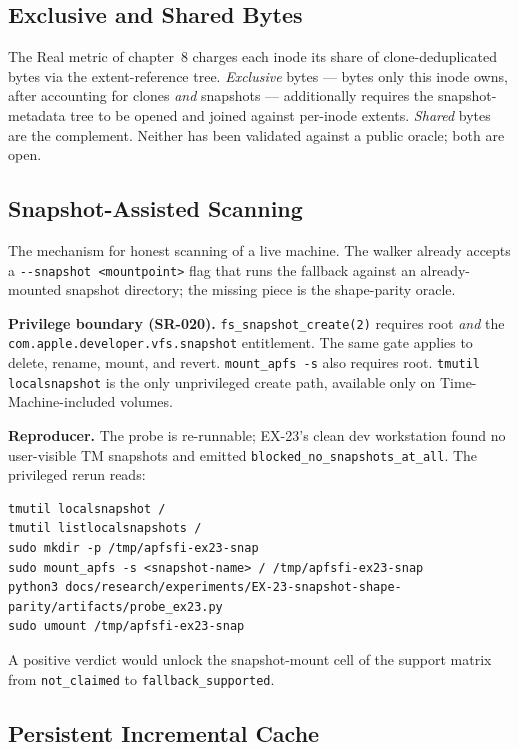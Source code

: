 \subsection{Exclusive and Shared Bytes}

The Real metric of chapter~8 charges each inode its share of
clone-deduplicated bytes via the extent-reference tree.
\emph{Exclusive} bytes --- bytes only this inode owns, after
accounting for clones \emph{and} snapshots --- additionally
requires the snapshot-metadata tree to be opened and joined
against per-inode extents. \emph{Shared} bytes are the
complement. Neither has been validated against a public oracle;
both are open.

\subsection{Snapshot-Assisted Scanning}

The mechanism for honest scanning of a live machine. The walker
already accepts a \texttt{-{}-snapshot <mountpoint>} flag that
runs the fallback against an already-mounted snapshot directory;
the missing piece is the shape-parity oracle.

\textbf{Privilege boundary (SR-020).}
\texttt{fs\_snapshot\_create(2)} requires root \emph{and} the
\texttt{com.apple.developer.vfs.snapshot} entitlement. The same
gate applies to delete, rename, mount, and revert.
\texttt{mount\_apfs -s} also requires root.
\texttt{tmutil localsnapshot} is the only unprivileged create
path, available only on Time-Machine-included volumes.

\textbf{Reproducer.} The probe is re-runnable; EX-23's clean dev
workstation found no user-visible TM snapshots and emitted
\texttt{blocked\_no\_snapshots\_at\_all}. The privileged rerun
reads:

\begin{verbatim}
tmutil localsnapshot /
tmutil listlocalsnapshots /
sudo mkdir -p /tmp/apfsfi-ex23-snap
sudo mount_apfs -s <snapshot-name> / /tmp/apfsfi-ex23-snap
python3 docs/research/experiments/EX-23-snapshot-shape-parity/artifacts/probe_ex23.py
sudo umount /tmp/apfsfi-ex23-snap
\end{verbatim}

A positive verdict would unlock the snapshot-mount cell of the
support matrix from \texttt{not\_claimed} to
\texttt{fallback\_supported}.

\subsection{Persistent Incremental Cache}

